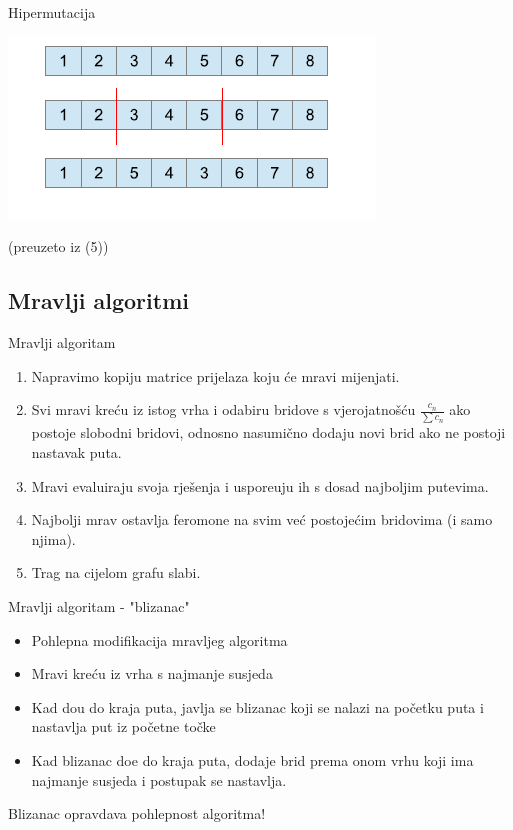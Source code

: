 \documentclass{beamer}
\begin{document}
\begin{frame}{Hipermutacija}
\begin{center}
\includegraphics[scale = 0.6]{mutacija.png}
\end{center}
\begin{center} \tiny (preuzeto iz (5)) \end{center}
\end{frame}

\subsection{Mravlji algoritmi}
\begin{frame}{Mravlji algoritam}

\begin{enumerate}
\item Napravimo kopiju matrice prijelaza koju \'{c}e mravi mijenjati.
\item Svi mravi kre\'{c}u iz istog vrha i odabiru bridove s vjerojatno\v{s}\'{c}u $\frac{c_n}{\sum{c_n}}  $ ako postoje slobodni bridovi, odnosno nasumi\v{c}no dodaju novi brid ako ne postoji nastavak puta.
\item Mravi evaluiraju svoja rje\v{s}enja i uspore\dj{}uju ih s dosad najboljim putevima.
\item Najbolji mrav ostavlja feromone na svim ve\'{c} postoje\'{c}im bridovima (i samo njima).
\item Trag na cijelom grafu slabi. 

\end{enumerate}

\end{frame}

\begin{frame}{Mravlji algoritam - "blizanac"}

\begin{itemize}
\item Pohlepna modifikacija mravljeg algoritma
\item Mravi kre\'{c}u iz vrha s najmanje susjeda
\item Kad do\dj{}u do kraja puta, javlja se blizanac koji se nalazi na po\v{c}etku puta i nastavlja put iz po\v{c}etne to\v{c}ke
\item Kad blizanac do\dj{}e do kraja puta, dodaje brid prema onom vrhu koji ima najmanje susjeda i postupak se nastavlja.
 
\end{itemize}

Blizanac opravdava pohlepnost algoritma!

\end{frame}
\end{document}
